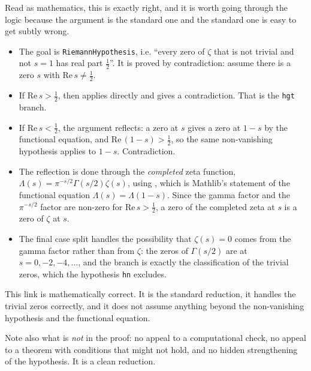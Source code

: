 Read as mathematics, this is exactly right, and it is worth going through the
logic because the argument is the standard one and the standard one is easy to
get subtly wrong.

\begin{itemize}
\item The goal is \texttt{RiemannHypothesis}, i.e. ``every zero of $\zeta$
that is not trivial and not $s=1$ has real part $\tfrac12$''. It is proved by
contradiction: assume there is a zero $s$ with $\mathrm{Re}\,  s \neq \tfrac12$.
\item If $\mathrm{Re}\,  s > \tfrac12$, then 
applies directly and gives a contradiction. That is the \texttt{hgt} branch.
\item If $\mathrm{Re}\,  s < \tfrac12$, the argument reflects: a zero at $s$ gives a zero
at $1-s$ by the functional equation, and $\mathrm{Re}\, (1-s) > \tfrac12$, so the same
non-vanishing hypothesis applies to $1-s$. Contradiction.
\item The reflection is done through the \emph{completed} zeta function,
$\Lambda(s) = \pi^{-s/2}\Gamma(s/2)\zeta(s)$, using
, which is Mathlib's statement of the
functional equation $\Lambda(s) = \Lambda(1-s)$. Since the gamma factor and
the $\pi^{-s/2}$ factor are non-zero for $\mathrm{Re}\,  s > \tfrac12$, a zero of the
completed zeta at $s$ is a zero of $\zeta$ at $s$.
\item The final case split handles the possibility that $\zeta(s) = 0$ comes
from the gamma factor rather than from $\zeta$: the zeros of $\Gamma(s/2)$ are
at $s = 0, -2, -4, \dots$, and the branch  is exactly the classification of the
trivial zeros, which the hypothesis \texttt{hn} excludes.
\end{itemize}

\begin{keytakeaways}

\item This link is mathematically correct. It is the standard reduction, it
handles the trivial zeros correctly, and it does not assume anything beyond
the non-vanishing hypothesis and the functional equation.
\end{keytakeaways}

Note also what is \emph{not} in the proof: no appeal to a computational check,
no appeal to a theorem with conditions that might not hold, and no hidden
strengthening of the hypothesis. It is a clean reduction.

